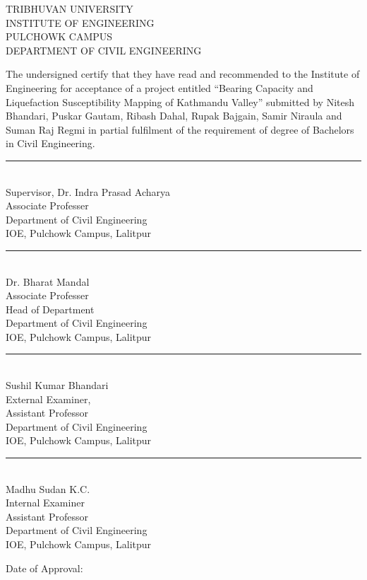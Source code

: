 \begin{titlepage}
\begin{center}
	\large 
	TRIBHUVAN UNIVERSITY\\
	INSTITUTE OF ENGINEERING\\
	PULCHOWK CAMPUS\\
	DEPARTMENT OF CIVIL ENGINEERING
\end{center}
\vfill
The undersigned certify that they have read and recommended to the Institute of Engineering for acceptance of a project entitled “Bearing Capacity and Liquefaction Susceptibility Mapping of Kathmandu Valley” submitted by Nitesh Bhandari, Puskar Gautam, Ribash Dahal, Rupak Bajgain, Samir Niraula and Suman Raj Regmi in partial fulfilment of the requirement of degree of Bachelors in Civil Engineering.
\vfill

\begin{minipage}[t]{0.48\linewidth}
\rule{0.7\textwidth}{0.4pt}\\
Supervisor, Dr. Indra Prasad Acharya\\
Associate Professer\\
Department of Civil Engineering\\
IOE, Pulchowk Campus, Lalitpur
\end{minipage}%
\begin{minipage}[t]{0.48\linewidth}
\rule{0.7\textwidth}{0.4pt}\\
Dr. Bharat Mandal\\
Associate Professer\\
Head of Department\\
Department of Civil Engineering\\
IOE, Pulchowk Campus, Lalitpur
\end{minipage}

\vfill
\begin{minipage}[t]{0.48\linewidth}
\rule{0.7\textwidth}{0.4pt}\\
Sushil Kumar Bhandari\\
External Examiner,\\
Assistant Professor\\
Department of Civil Engineering\\
IOE, Pulchowk Campus, Lalitpur
\end{minipage}%
\begin{minipage}[t]{0.48\linewidth}
\rule{0.7\textwidth}{0.4pt}\\
Madhu Sudan K.C.\\
Internal Examiner\\
Assistant Professor\\
Department of Civil Engineering\\
IOE, Pulchowk Campus, Lalitpur
\end{minipage}

\vfill

Date of Approval:
\end{titlepage}